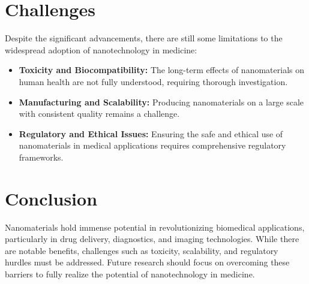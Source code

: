 \documentclass[10pt]{article}
\begin{document}
\section{Challenges}
Despite the significant advancements, there are still some limitations to the widespread adoption of nanotechnology in medicine:
\begin{itemize}
    \item \textbf{Toxicity and Biocompatibility:} The long-term effects of nanomaterials on human health are not fully understood, requiring thorough investigation.
    \item \textbf{Manufacturing and Scalability:} Producing nanomaterials on a large scale with consistent quality remains a challenge.
    \item \textbf{Regulatory and Ethical Issues:} Ensuring the safe and ethical use of nanomaterials in medical applications requires comprehensive regulatory frameworks.
\end{itemize}

\section{Conclusion}
Nanomaterials hold immense potential in revolutionizing biomedical applications, particularly in drug delivery, diagnostics, and imaging technologies. While there are notable benefits, challenges such as toxicity, scalability, and regulatory hurdles must be addressed. Future research should focus on overcoming these barriers to fully realize the potential of nanotechnology in medicine.



\end{document}
